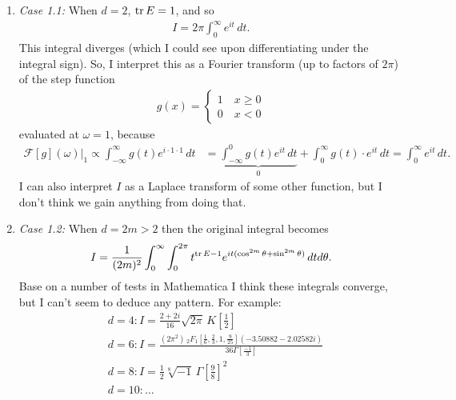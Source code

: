 \documentclass{article}
\theoremstyle{definition}
\newcommand{\nn}{\nonumber}
\newcommand{\F}{\mathcal{F}}
\newcommand{\f}[2]{\frac{#1}{#2}}
\newcommand{\lb}{\left[}
\newcommand{\rb}{\right]}
\begin{document}
\begin{enumerate}
\begin{enumerate}
		
		\begin{enumerate}
			\item \textit{Case 1.1:} When $d=2$, $\tr E = 1$, and so 
			\begin{align}
			I = 2\pi \int^\infty_0 e^{it}\,dt.
			\end{align}
			This integral diverges (which I could see upon differentiating under the integral sign). So, I interpret this as a Fourier transform (up to factors of $2\pi$) of the step function
			\begin{align}
			g(x) = \begin{cases}
			1 \quad x\geq 0 \\ 
			0 \quad x < 0
			\end{cases}
			\end{align}
			evaluated at $\omega=1$, because
			\begin{align}
			\F[g](\omega)\bigg\vert_1 \propto \int_{-\infty}^{\infty} g(t)e^{i\cdot 1 \cdot 1}\,dt &= \underbrace{\int^0_{-\infty}g(t)e^{it}\,dt}_0 + \int^\infty_0 g(t)\cdot e^{it}\,dt = \int^\infty_0 e^{it}\,dt.
			\end{align}
			I can also interpret $I$ as a Laplace transform of some other function, but I don't think we gain anything from doing that.\\
			
			
			\item \textit{Case 1.2:} When $d = 2m >2$ then the original integral becomes
			\begin{align}
			I = \f{1}{(2m)^2}\int_0^\infty \int_0^{2\pi} t^{\tr E -1 } e^{it(\cos^{2m}\theta + \sin^{2m} \theta)}\,dtd\theta.
			\end{align}
			Base on a number of tests in Mathematica I think these integrals converge, but I can't seem to deduce any pattern. For example:
			\begin{align}
			&d=4: I = \f{2 + 2i}{16} \sqrt{2\pi}\, K\lb \f{1}{2} \rb\nn\\
			&d=6: I = \f{(2 \pi^2)\,_2F_1\lb \f{1}{6}, \f{2}{3}, 1, \f{9}{25}\rb (-3.50882 - 2.02582 i)}{36\Gamma\lb \f{-1}{3} \rb}\nn\\
			&d=8: I = \f{1}{2} \sqrt[8]{-1}\, \Gamma\lb \f{9}{8} \rb^2\nn\\
			&d=10: \dots\nn
			\end{align}
			
			
		\end{enumerate}
			
			
			
			
			

\end{enumerate}
\end{enumerate}
\end{document}
